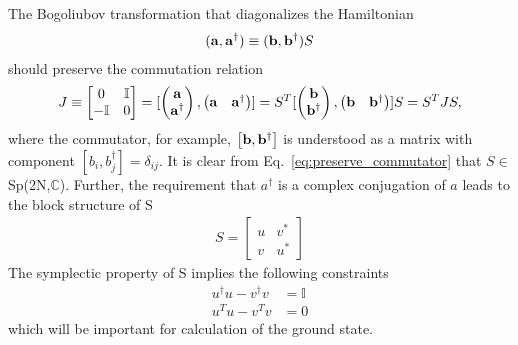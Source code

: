 The Bogoliubov transformation that diagonalizes the Hamiltonian
\begin{eqnarray}\begin{aligned}
\label{eq:def_a}
({\bf a} , {\bf a}^\dagger)\equiv({\bf b} , {\bf b}^\dagger)S
\end{aligned}\end{eqnarray}
should preserve the commutation relation
\begin{eqnarray}\begin{aligned}
\label{eq:preserve_commutator}
J\equiv\begin{bmatrix}
0 & \mathbb{I}\\
-\mathbb{I} & 0
\end{bmatrix}
=[
\begin{pmatrix}
{\bf a} \\
{\bf a}^\dagger
\end{pmatrix},
\begin{pmatrix}
{\bf a} & {\bf a}^\dagger
\end{pmatrix}]
=S^T[
\begin{pmatrix}
{\bf b} \\
{\bf b}^\dagger
\end{pmatrix},
\begin{pmatrix}
{\bf b} & {\bf b}^\dagger
\end{pmatrix}]S
=S^T JS,
\end{aligned}\end{eqnarray}
where the commutator, for example, $\left[{\bf b},{\bf b}^\dagger\right]$ is understood as a matrix with component $[b_i,b_j^\dagger]=\delta_{ij}$. It is clear from Eq.~\eqref{eq:preserve_commutator} that $S\in$Sp(2N,$\mathbb{C}$)\cite{fulton_representation_2004}. Further, the requirement that $a^\dagger$ is a complex conjugation of $a$ leads to the block structure of S
\begin{eqnarray}
\label{eq:block_S}
S=
\begin{bmatrix}
u & v^*\\
v & u^*
\end{bmatrix}
\end{eqnarray}
The symplectic property of S implies the following constraints 
\begin{eqnarray}
u^\dagger u-v^\dagger v&=\mathbb{I}\label{eq:constraint_1}\\
u^T u-v^T v&=0\label{eq:constraint_2}
\end{eqnarray}
which will be important for calculation of the ground state. 

